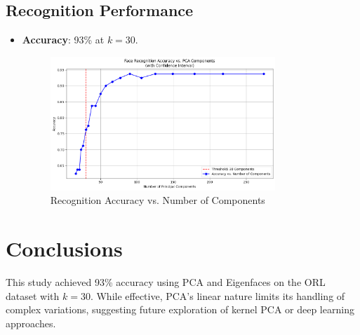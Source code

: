 \documentclass{article}
\begin{document}
	\subsection{Recognition Performance}
	\begin{itemize}
		\item \textbf{Accuracy}: 93\% at \(k=30\).
		\begin{figure}[h]
			\centering
			\includegraphics[width=0.8\textwidth]{Face Recognition Accuracy vs. PCA components.png}
			\caption{Recognition Accuracy vs. Number of Components}
			\label{fig:accuracy_k}
		\end{figure}
	\end{itemize}
	
	\section{Conclusions}
	This study achieved 93\% accuracy using PCA and Eigenfaces on the ORL dataset with \(k=30\). While effective, PCA’s linear nature limits its handling of complex variations, suggesting future exploration of kernel PCA or deep learning approaches.
	
	
	
	
\end{document}
